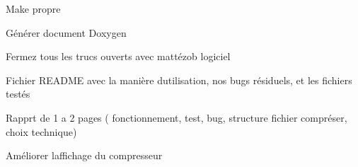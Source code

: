 
\begin{DoxyItemize}
\item Make propre
\item Générer document Doxygen
\item Fermez tous les trucs ouverts avec mattézob logiciel
\item Fichier R\+E\+A\+D\+ME avec la manière d\textquotesingle{}utilisation, nos bugs résiduels, et les fichiers testés
\item Rapprt de 1 a 2 pages ( fonctionnement, test, bug, structure fichier compréser, choix technique)
\item Améliorer l\textquotesingle{}affichage du compresseur 
\end{DoxyItemize}